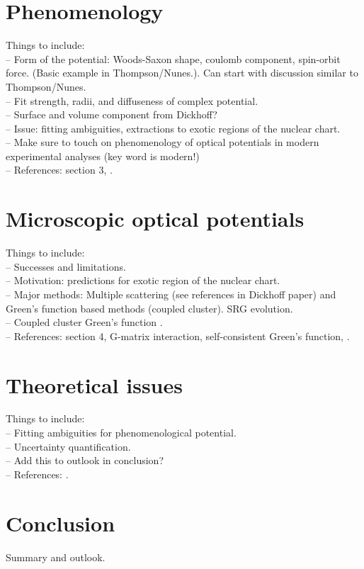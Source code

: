 \documentclass[preprintnumbers,floatfix,aps,prc,preprint,nofootinbib]{revtex4-1}
\begin{document}
\section{Phenomenology}
\label{sec:phenomenology}


Things to include:
\\
-- Form of the potential: Woods-Saxon shape, coulomb component, spin-orbit force. (Basic example in Thompson/Nunes.). Can start with discussion similar to Thompson/Nunes.
\\
-- Fit strength, radii, and diffuseness of complex potential.
\\
-- Surface and volume component from Dickhoff?
\\
-- Issue: fitting ambiguities, extractions to exotic regions of the nuclear chart.
\\
-- Make sure to touch on phenomenology of optical potentials in modern experimental analyses (key word is modern!)
\\
-- References: \cite{Dickhoff:2018wdd} section 3, \cite{Koning:2003zz}.



\section{Microscopic optical potentials}
\label{sec:microscopic}


Things to include:
\\
-- Successes and limitations.
\\
-- Motivation: predictions for exotic region of the nuclear chart.
\\
-- Major methods: Multiple scattering (see references in Dickhoff paper) and Green's function based methods (coupled cluster). SRG evolution.
\\
-- Coupled cluster Green's function \cite{Rotureau:2016jpf}.
\\
-- References: \cite{Dickhoff:2018wdd} section 4, \cite{Furumoto:2019anr} G-matrix interaction, \cite{Idini:2019hkq} self-consistent Green's function, \cite{Rotureau:2016jpf}.


\section{Theoretical issues}
\label{sec:section_4}


Things to include:
\\
-- Fitting ambiguities for phenomenological potential.
\\
-- Uncertainty quantification.
\\
-- Add this to outlook in conclusion?
\\
-- References: \cite{King:2018vzw}.


\section{Conclusion}
\label{sec:conclusion}


Summary and outlook.





\end{document}
